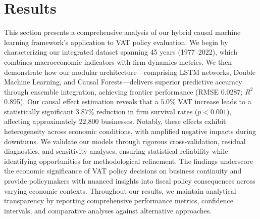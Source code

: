 \section{Results}\label{sec:results}
This section presents a comprehensive analysis of our hybrid causal machine learning framework's application to VAT policy evaluation. We begin by characterizing our integrated dataset spanning 45 years (1977--2022), which combines macroeconomic indicators with firm dynamics metrics. We then demonstrate how our modular architecture—comprising LSTM networks, Double Machine Learning, and Causal Forests—delivers superior predictive accuracy through ensemble integration, achieving frontier performance (RMSE 0.0287; $R^2$ 0.895). Our causal effect estimation reveals that a $5.0\%$ VAT increase leads to a statistically significant $3.87\%$ reduction in firm survival rates ($p < 0.001$), affecting approximately 22,800 businesses. Notably, these effects exhibit heterogeneity across economic conditions, with amplified negative impacts during downturns. We validate our models through rigorous cross-validation, residual diagnostics, and sensitivity analyses, ensuring statistical reliability while identifying opportunities for methodological refinement. The findings underscore the economic significance of VAT policy decisions on business continuity and provide policymakers with nuanced insights into fiscal policy consequences across varying economic contexts. Throughout our results, we maintain analytical transparency by reporting comprehensive performance metrics, confidence intervals, and comparative analyses against alternative approaches.
